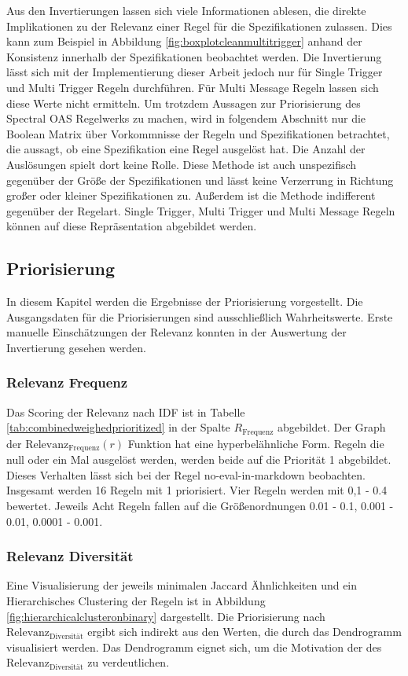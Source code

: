 Aus den Invertierungen lassen sich viele Informationen ablesen, die direkte Implikationen zu der Relevanz einer Regel für die Spezifikationen zulassen. Dies kann zum Beispiel in Abbildung \ref{fig:boxplotcleanmultitrigger} anhand der Konsistenz innerhalb der Spezifikationen beobachtet werden. Die Invertierung lässt sich mit der Implementierung dieser Arbeit jedoch nur für Single Trigger und Multi Trigger Regeln durchführen. Für Multi Message Regeln lassen sich diese Werte nicht ermitteln. Um trotzdem Aussagen zur Priorisierung des Spectral \acs{OAS} Regelwerks zu machen, wird in folgendem Abschnitt nur die Boolean Matrix über Vorkommnisse der Regeln und Spezifikationen betrachtet, die aussagt, ob eine Spezifikation eine Regel ausgelöst hat. Die Anzahl der Auslösungen spielt dort keine Rolle. Diese Methode ist auch unspezifisch gegenüber der Größe der Spezifikationen und lässt keine Verzerrung in Richtung großer oder kleiner Spezifikationen zu. Außerdem ist die Methode indifferent gegenüber der Regelart. Single Trigger, Multi Trigger und Multi Message Regeln können auf diese Repräsentation abgebildet werden.


\subsection{Priorisierung} \label{sec:priorisierung}
In diesem Kapitel werden die Ergebnisse der Priorisierung vorgestellt. Die Ausgangsdaten für die Priorisierungen sind ausschließlich Wahrheitswerte. Erste manuelle Einschätzungen der Relevanz konnten in der Auswertung der Invertierung gesehen werden. 


\subsubsection{Relevanz Frequenz} \label{sec:iversesfrequenzscoring}
Das Scoring der Relevanz nach \acl{IDF} ist in Tabelle \ref{tab:combinedweighedprioritized} in der Spalte $R_\text{Frequenz}$ abgebildet. Der Graph der $\text{Relevanz}_\text{Frequenz}(r)$ Funktion hat eine hyperbelähnliche Form. Regeln die null oder ein Mal ausgelöst werden, werden beide auf die Priorität 1 abgebildet. Dieses Verhalten lässt sich bei der Regel no-eval-in-markdown beobachten. Insgesamt werden 16 Regeln mit 1 priorisiert. Vier Regeln werden mit 0,1 - 0.4 bewertet. Jeweils Acht Regeln fallen auf die Größenordnungen 0.01 - 0.1, 0.001 - 0.01, 0.0001 - 0.001.


\subsubsection{Relevanz Diversität} \label{sec:diversitätsscoring}
Eine Visualisierung der jeweils minimalen Jaccard Ähnlichkeiten und ein Hierarchisches Clustering der Regeln ist in Abbildung \ref{fig:hierarchicalclusteronbinary} dargestellt. Die Priorisierung nach $\text{Relevanz}_\text{Diversität}$ ergibt sich indirekt aus den Werten, die durch das Dendrogramm visualisiert werden. Das Dendrogramm eignet sich, um die Motivation der des $\text{Relevanz}_\text{Diversität}$ zu verdeutlichen.

